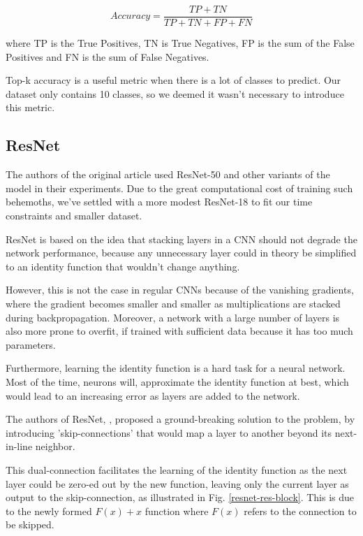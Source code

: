 \documentclass{article}
\begin{document}
$$ Accuracy = \frac{TP + TN}{TP + TN + FP + FN}  $$ \medskip \par

\noindent
where TP is the True Positives, TN is True Negatives, FP is the sum of the False Positives
and FN is the sum of False Negatives. \medskip \par

\noindent
Top-k accuracy is a useful metric when there is a lot of classes to predict. Our dataset only
contains 10 classes, so we deemed it wasn't necessary to introduce this metric.

\subsection{ResNet}

The authors of the original article used ResNet-50 and 
other variants of the model in their experiments. 
Due to the great computational cost of training such behemoths, 
we've settled with a more modest ResNet-18 to fit our time constraints and smaller dataset. \medskip \par

\noindent
ResNet is based on the idea that stacking layers in a CNN should not degrade the network performance,
because any unnecessary layer could in theory be simplified 
to an identity function that wouldn't change anything. \medskip \par

\noindent
However, this is not the case in regular CNNs because of the vanishing gradients, 
where the gradient becomes smaller and smaller as multiplications are stacked during backpropagation.
Moreover, a network with a large number of layers is also more prone to overfit, 
if trained with sufficient data because it has too much parameters. \medskip \par

\noindent
Furthermore, learning the identity function is a hard task for a neural network. 
Most of the time, neurons will, approximate the identity function at best, 
which would lead to an increasing error as layers are added to the network. \medskip \par

\noindent
The authors of ResNet, \cite{resnet2015}, proposed a ground-breaking solution to the problem, 
by introducing 'skip-connections' 
that would map a layer to another beyond its next-in-line neighbor. \medskip \par

\noindent
This dual-connection facilitates the learning of the identity function as 
the next layer could be zero-ed out by the new function, leaving only the current layer as output to 
the skip-connection, as illustrated in Fig. \ref{resnet-res-block}. 
This is due to the newly formed $F(x) + x$ function where $F(x)$ refers to the connection to be skipped.
\vspace{0.7cm}
\end{document}
